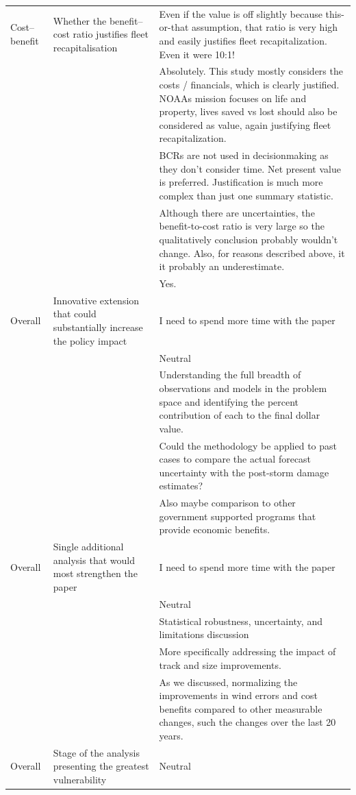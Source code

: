 \begin{longtable}[t]{lp{4.2cm}p{8.2cm}}
Cost--benefit & Whether the benefit--cost ratio justifies fleet recapitalisation & Even if the value is off slightly because this-or-that assumption, that ratio is very high and easily justifies fleet recapitalization. Even it were 10:1!\\
\addlinespace
 &  & Absolutely. This study mostly considers the costs / financials, which is clearly justified. NOAAs mission focuses on life and property, lives saved vs lost should also be considered as value, again justifying fleet recapitalization.\\
 &  & BCRs are not used in decisionmaking as they don't consider time. Net present value is preferred. Justification is much more complex than just one summary statistic.\\
 &  & Although there are uncertainties, the benefit-to-cost ratio is very large so the  qualitatively conclusion probably wouldn't change. Also, for reasons described above, it it probably an underestimate.\\
 &  & Yes.\\
Overall & Innovative extension that could substantially increase the policy impact & I need to spend more time with the paper\\
\addlinespace
 &  & Neutral\\
 &  & Understanding the full breadth of observations and models in the problem space and identifying the percent contribution of each to the final dollar value.\\
 &  & Could the methodology be applied to past cases to compare the actual forecast uncertainty with the post-storm damage estimates?\\
 &  & Also maybe comparison to other government supported programs that provide economic benefits.\\
Overall & Single additional analysis that would most strengthen the paper & I need to spend more time with the paper\\
\addlinespace
 &  & Neutral\\
 &  & Statistical robustness, uncertainty, and limitations discussion\\
 &  & More specifically addressing the impact of track and size improvements.\\
 &  & As we discussed, normalizing the improvements in wind errors and cost benefits compared to other measurable changes, such the changes over the last 20 years.\\
Overall & Stage of the analysis presenting the greatest vulnerability & Neutral\\

\end{longtable}
